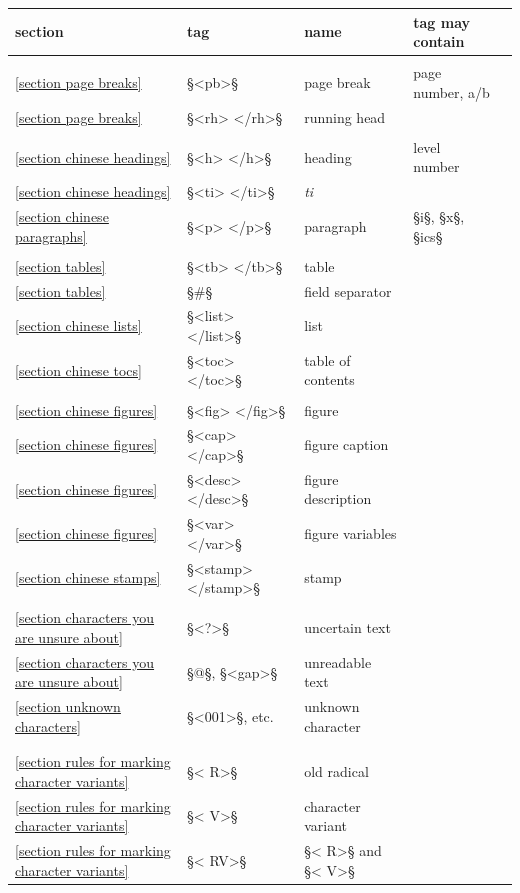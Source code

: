 \documentclass[fontsize=11pt, paper=a4, 
DIV15,
headings=normal,
parskip=half-, 
numbers=noenddot]{scrartcl}
\newcommand{\chin}[1]{{\fontspec{Sun-ExtA}{#1}}}
\newcommand{\z}[1]{\chin{#1}} %
\begin{document}
\begin{longtable}[l]{@{}llll@{}l@{}}
section & tag & name & tag may contain \\[1mm]
\hline \\
\ref{section page breaks} & §<pb>§ & page break & page number, a/b \\
\ref{section page breaks} & §<rh> </rh>§ & running head &\\
\\
\ref{section chinese headings} & §<h> </h>§ & heading & level number \\
\ref{section chinese headings} & §<ti> </ti>§ & \emph{ti} \z{題} &\\
\ref{section chinese paragraphs} & §<p> </p>§ & paragraph & §i§, §x§, §ics§ \\
\\
\ref{section tables} & §<tb> </tb>§ & table &\\
\ref{section tables} & §#§ & field separator \\
\ref{section chinese lists} & §<list> </list>§ & list &\\
\ref{section chinese tocs} & §<toc> </toc>§ & table of contents &\\
\\
\ref{section chinese figures} & §<fig> </fig>§ & figure & \\
\ref{section chinese figures} & §<cap> </cap>§ & figure caption &\\ 
\ref{section chinese figures} & §<desc> </desc>§ & figure description &\\ 
\ref{section chinese figures} & §<var> </var>§ & figure variables &\\ 
\ref{section chinese stamps} & §<stamp> </stamp>§ & stamp & \\
\\
\ref{section characters you are unsure about} & §<?>§ & uncertain text & \\
\ref{section characters you are unsure about} & §@§, §<gap>§ & unreadable text & \\
\ref{section unknown characters} & §<001>§, etc. & unknown character & \\ 
\\
\hline \\
\ref{section rules for marking character variants} & §< R>§ & old radical & \\
\ref{section rules for marking character variants} & §< V>§ & character variant & \\
\ref{section rules for marking character variants} & §< RV>§ & §< R>§ and §< V>§ & \\

\end{longtable}
\end{document}
